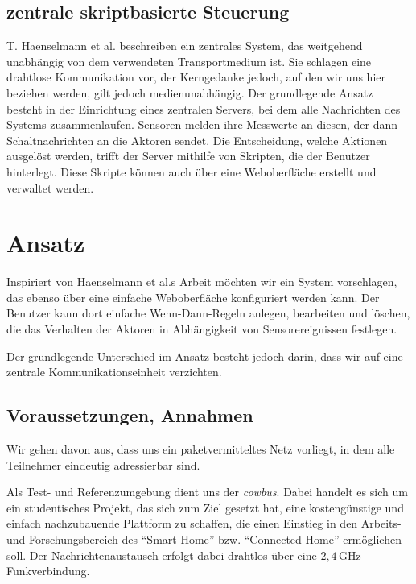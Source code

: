 \documentclass{IEEEtran}
\begin{document}
    \subsection{zentrale skriptbasierte Steuerung}
        T. Haenselmann et al. beschreiben ein zentrales System, das weitgehend
        unabhängig von dem verwendeten Transportmedium ist.
        Sie schlagen eine drahtlose Kommunikation vor,
        der Kerngedanke jedoch, auf den wir uns hier beziehen werden,
        gilt jedoch medienunabhängig.
        Der grundlegende Ansatz besteht in der Einrichtung eines zentralen
        Servers, bei dem alle Nachrichten des Systems zusammenlaufen.
        Sensoren melden ihre Messwerte an diesen, der dann Schaltnachrichten
        an die Aktoren sendet.
        Die Entscheidung, welche Aktionen ausgelöst werden, trifft der Server
        mithilfe von Skripten, die der Benutzer hinterlegt.
        Diese Skripte können auch über eine Weboberfläche erstellt und
        verwaltet werden.
    \cite{haenselmann2007skriptbasierte}


\section{Ansatz}
    Inspiriert von Haenselmann et al.s Arbeit möchten wir ein System vorschlagen,
    das ebenso über eine einfache Weboberfläche konfiguriert werden kann.
    Der Benutzer kann dort einfache Wenn-Dann-Regeln anlegen, bearbeiten und
    löschen, die das Verhalten der Aktoren in Abhängigkeit von Sensorereignissen
    festlegen.

    Der grundlegende Unterschied im Ansatz besteht jedoch darin,
    dass wir auf eine zentrale Kommunikationseinheit verzichten.

    \subsection{Voraussetzungen, Annahmen}
        Wir gehen davon aus, dass uns ein paketvermitteltes Netz vorliegt,
        in dem alle Teilnehmer eindeutig adressierbar sind.

        Als Test- und Referenzumgebung dient uns der \emph{cowbus}.
        Dabei handelt es sich um ein studentisches Projekt,
        das sich zum Ziel gesetzt hat,
        eine kostengünstige und einfach nachzubauende Plattform zu schaffen,
        die einen Einstieg in den Arbeits- und Forschungsbereich des
        \enquote{Smart Home} bzw. \enquote{Connected Home} ermöglichen soll.
        Der Nachrichtenaustausch erfolgt dabei drahtlos über eine
        $2,4$\,GHz-Funkverbindung. \cite{cowbus}
\end{document}
